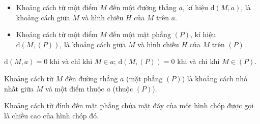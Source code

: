 \begin{tomtat}
\begin{minipage}{0.5\textwidth}
\end{minipage}
\begin{boxdn}
	\begin{itemize}
	\item Khoảng cách từ một điểm $M$ đến một đường thẳng $a$, kí hiệu $\mathrm{d}(M,a)$, là khoảng cách giữa $M$ và hình chiếu $H$ của $M$ trên $a$.
	\item Khoảng cách từ một điểm $M$ đến một mặt phẳng $(P)$, kí hiệu $\mathrm{d}(M,(P))$, là khoảng cách giữa $M$ và hình chiếu $H$ của $M$ trên $(P)$.
	\end{itemize}
\end{boxdn}
\begin{boxdn}
	$\mathrm{d}(M,a)=0$ khi và chỉ khi $M\in a$; $\mathrm{d}(M,(P))=0$ khi và chỉ khi $M \in(P)$.
\end{boxdn}
\begin{nx}
	Khoảng cách từ $M$ đến đường thẳng $a$ (mặt phẳng $(P)$) là khoảng cách nhỏ nhất giữa $M$ và một điểm thuộc $a$ (thuộc $(P)$).
\end{nx}
\begin{boxdn}
	Khoảng cách từ đỉnh đến mặt phẳng chứa mặt đáy của một hình chóp được gọi là chiều cao của hình chóp đó.
\end{boxdn}

\end{tomtat}
